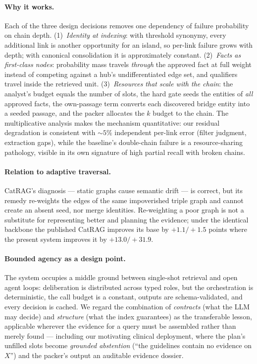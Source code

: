 \documentclass[11pt,a4paper]{article}
\begin{document}
\paragraph{Why it works.} Each of the three design decisions removes one
dependency of failure probability on chain depth. (1)~\emph{Identity at
indexing}: with threshold synonymy, every additional link is another
opportunity for an island, so per-link failure grows with depth; with
canonical consolidation it is approximately constant. (2)~\emph{Facts as
first-class nodes}: probability mass travels \emph{through} the approved
fact at full weight instead of competing against a hub's undifferentiated
edge set, and qualifiers travel inside the retrieved unit.
(3)~\emph{Resources that scale with the chain}: the analyst's budget equals
the number of slots, the hard gate seeds the entities of \emph{all} approved
facts, the own-passage term converts each discovered bridge entity into a
seeded passage, and the packer allocates the $k$ budget to the chain. The
multiplicative analysis makes the mechanism quantitative: our residual
degradation is consistent with ${\sim}5\%$ independent per-link error
(filter judgment, extraction gaps), while the baseline's double-chain
failure is a resource-sharing pathology, visible in its own signature of
high partial recall with broken chains.

\paragraph{Relation to adaptive traversal.} CatRAG's diagnosis --- static
graphs cause semantic drift --- is correct, but its remedy re-weights the
edges of the same impoverished triple graph and cannot create an absent
seed, nor merge identities. Re-weighting a poor graph is not a substitute
for representing better and planning the evidence; under the identical
backbone the published CatRAG improves its base by $+1.1/+1.5$ points where
the present system improves it by $+13.0/+31.9$.

\paragraph{Bounded agency as a design point.} The system occupies a middle
ground between single-shot retrieval and open agent loops: deliberation is
distributed across typed roles, but the orchestration is deterministic, the
call budget is a constant, outputs are schema-validated, and every decision
is cached. We regard the combination of \emph{contracts} (what the LLM may
decide) and \emph{structure} (what the index guarantees) as the
transferable lesson, applicable wherever the evidence for a query must be
assembled rather than merely found --- including our motivating clinical
deployment, where the plan's unfilled slots become \emph{grounded
abstention} (``the guidelines contain no evidence on $X$'') and the packer's
output an auditable evidence dossier.
\end{document}
